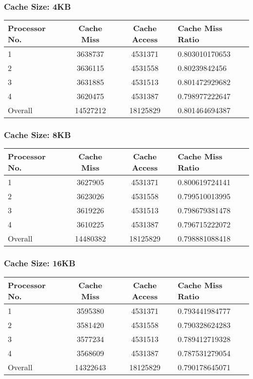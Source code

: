 \documentclass[]{article}
\begin{document}
\subsubsection{Cache Size: 4KB}
\begin{tabularx}{\textwidth}{ | l | c | c | X | }
\hline
Processor No.    & Cache Miss    & Cache Access  &   Cache Miss Ratio \\
\hline
1    & 3638737  & 4531371    & 0.803010170653 \\
\hline
2    & 3636115  & 4531558    & 0.80239842456 \\
\hline
3    & 3631885  & 4531513    & 0.801472929682 \\
\hline
4    & 3620475  & 4531387    & 0.798977222647 \\
\hline
Overall & 14527212    & 18125829  & 0.801464694387 \\
\hline
\end{tabularx}


\subsubsection{Cache Size: 8KB}
\begin{tabularx}{\textwidth}{ | l | c | c | X | }
\hline
Processor No.    & Cache Miss    & Cache Access  &   Cache Miss Ratio \\
\hline
1    & 3627905  & 4531371    & 0.800619724141 \\
\hline
2    & 3623026  & 4531558    & 0.799510013995 \\
\hline
3    & 3619226  & 4531513    & 0.798679381478 \\
\hline
4    & 3610225  & 4531387    & 0.796715222072 \\
\hline
Overall & 14480382    & 18125829  & 0.798881088418 \\
\hline
\end{tabularx}


\subsubsection{Cache Size: 16KB}
\begin{tabularx}{\textwidth}{ | l | c | c | X | }
\hline
Processor No.    & Cache Miss    & Cache Access  &   Cache Miss Ratio \\
\hline
1    & 3595380  & 4531371    & 0.793441984777 \\
\hline
2    & 3581420  & 4531558    & 0.790328624283 \\
\hline
3    & 3577234  & 4531513    & 0.789412719328 \\
\hline
4    & 3568609  & 4531387    & 0.787531279054 \\
\hline
Overall & 14322643    & 18125829  & 0.790178645071 \\
\hline
\end{tabularx}
\end{document}
